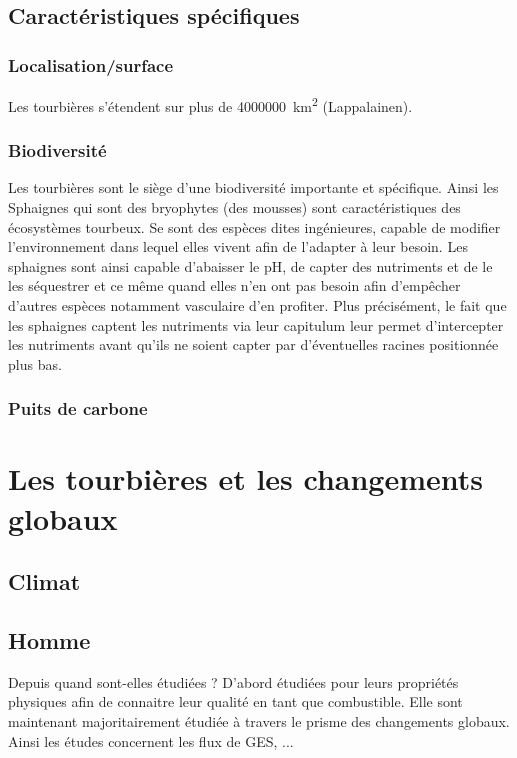 \subsection{Caractéristiques spécifiques}

\subsubsection{Localisation/surface}
Les tourbières s'étendent sur plus de \SI{4000000}{\square\km} (Lappalainen).

\subsubsection{Biodiversité}
Les tourbières sont le siège d'une biodiversité importante et spécifique.
Ainsi les Sphaignes qui sont des bryophytes (des mousses) sont caractéristiques des écosystèmes tourbeux.
Se sont des espèces dites ingénieures, capable de modifier l'environnement dans lequel elles vivent afin de l'adapter à leur besoin.
Les sphaignes sont ainsi capable d'abaisser le pH, de capter des nutriments et de le les séquestrer et ce même quand elles n'en ont pas besoin afin d'empêcher d'autres espèces notamment vasculaire d'en profiter.
Plus précisément, le fait que les sphaignes captent les nutriments via leur capitulum leur permet d'intercepter les nutriments avant qu'ils ne soient capter par d'éventuelles racines positionnée plus bas.

\subsubsection{Puits de carbone}


\section{Les tourbières et les changements globaux}

\subsection{Climat}

\subsection{Homme}

Depuis quand sont-elles étudiées ?
D'abord étudiées pour leurs propriétés physiques afin de connaitre leur qualité en tant que combustible.
Elle sont maintenant majoritairement étudiée à travers le prisme des changements globaux.
Ainsi les études concernent les flux de GES, ...

